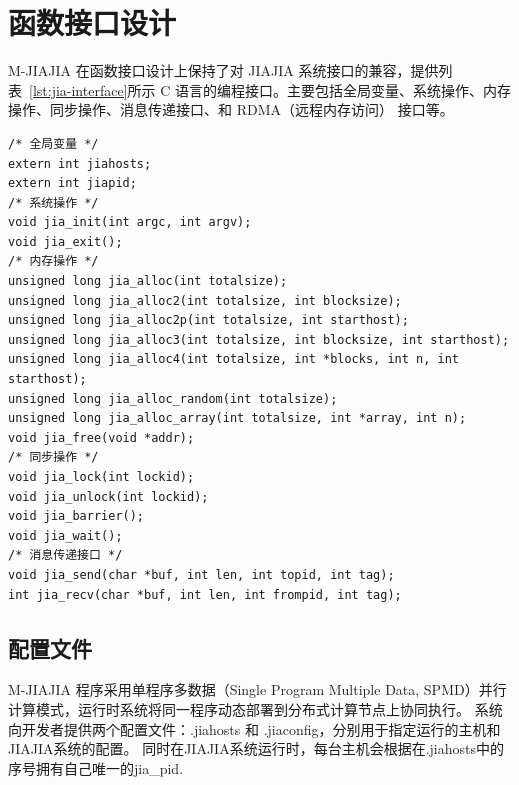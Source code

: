 {    \section{函数接口设计}\label{sec:函数接口设计}
    M-JIAJIA 在函数接口设计上保持了对 JIAJIA 系统接口的兼容，提供列表~\ref{lst:jia-interface}所示 C 语言的编程接口。主要包括全局变量、系统操作、内存操作、同步操作、消息传递接口、和 RDMA（远程内存访问） 接口等。
    \begin{lstlisting}[style=CStyle, caption={M-JIAJIA C 接口总览}, label={lst:jia-interface}]
/* 全局变量 */
extern int jiahosts;
extern int jiapid;
/* 系统操作 */
void jia_init(int argc, int argv);
void jia_exit();
/* 内存操作 */
unsigned long jia_alloc(int totalsize);
unsigned long jia_alloc2(int totalsize, int blocksize);
unsigned long jia_alloc2p(int totalsize, int starthost);
unsigned long jia_alloc3(int totalsize, int blocksize, int starthost);
unsigned long jia_alloc4(int totalsize, int *blocks, int n, int starthost);
unsigned long jia_alloc_random(int totalsize);
unsigned long jia_alloc_array(int totalsize, int *array, int n);
void jia_free(void *addr);
/* 同步操作 */
void jia_lock(int lockid);
void jia_unlock(int lockid);
void jia_barrier();
void jia_wait();
/* 消息传递接口 */
void jia_send(char *buf, int len, int topid, int tag);
int jia_recv(char *buf, int len, int frompid, int tag);
    \end{lstlisting}

    \subsection{配置文件}
    M-JIAJIA 程序采用单程序多数据（Single Program Multiple Data, SPMD）并行计算模式，运行时系统将同一程序动态部署到分布式计算节点上协同执行。
    系统向开发者提供两个配置文件：.jiahosts 和 .jiaconfig，分别用于指定运行的主机和JIAJIA系统的配置。
    同时在JIAJIA系统运行时，每台主机会根据在.jiahosts中的序号拥有自己唯一的jia\_pid.

}
